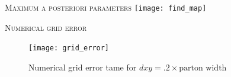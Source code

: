 \documentclass[aspectratio=169]{beamer}
\begin{document}
\begin{frame}[plain]
\end{frame}

\begin{frame}{\scshape Maximum a posteriori parameters}
  \texttt{[image: find\_map]}
\end{frame}

\begin{frame}{\scshape Numerical grid error}
  \begin{figure}
    \texttt{[image: grid\_error]}
    \caption{Numerical grid error tame for $dxy=.2 \times \text{parton width}$}
  \end{figure}
\end{frame}

\usebackgroundtemplate{}
\end{document}
